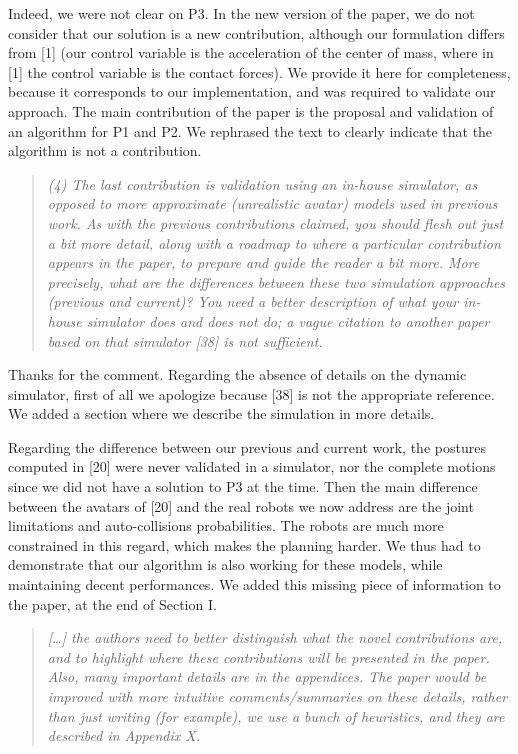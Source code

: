\documentclass[a4paper]{article}
\begin{document}
Indeed, we were not clear on P3. In the new version of the paper, we do not consider that our solution
is a new contribution, although our formulation differs from [1] (our control variable is the acceleration
of the center of mass, where in [1] the control variable is the contact forces). We provide it here for completeness, because it corresponds to our implementation, and 
was required to validate our approach. The main contribution of the paper is the proposal and validation of an algorithm for P1 and P2.
We rephrased the text to clearly indicate that the algorithm is not a contribution. 

\begin{quote}  \textit{
(4)	The last contribution is validation using an in-house
simulator, as opposed to more approximate (unrealistic avatar) models
used in previous work.	As with the previous contributions claimed, you
should flesh out just a bit more detail, along with a roadmap to where
a particular contribution appears in the paper, to prepare and guide
the reader a bit more. More precisely, what are the differences between
these two simulation approaches (previous and current)? You need a
better description of what your in-house simulator does and does not
do; a vague citation to another paper based on that simulator [38] is
not sufficient.}
\end{quote}

Thanks for the comment. Regarding the absence of details on the dynamic simulator, first of all we apologize because [38] is not the appropriate reference.
We added a section where we describe the simulation in more details. 

Regarding the difference between our previous and current work, the postures computed in [20] were never validated in a simulator, nor the complete motions since 
we did not have a solution to P3 at the time. Then the main
difference between the avatars of [20] and the real robots we now address are the joint limitations and auto-collisions probabilities.
The robots are much more constrained in this regard, which makes the planning harder. We thus had to demonstrate that our algorithm is also working
for these models, while maintaining decent performances.
We added this missing piece of information to the paper, at the end of Section I.


\begin{quote}  \textit{[\dots] the authors need to better
distinguish what the novel contributions are, and to highlight where
these contributions will be presented in the paper.  Also, many
important details are in the appendices. The paper would be improved
with more intuitive comments/summaries on these details, rather than
just writing (for example), we use a bunch of heuristics, and they are
described in Appendix X.}
\end{quote}
\end{document}
